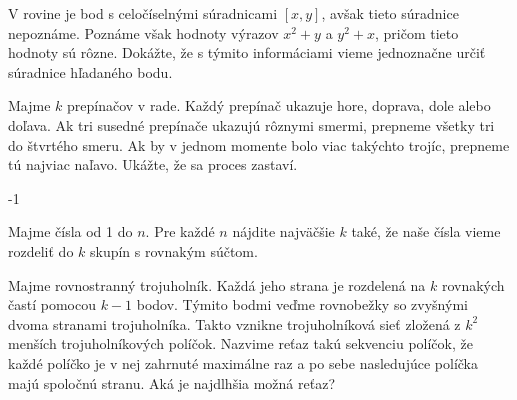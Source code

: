 {%

{
V rovine je bod s celočíselnými súradnicami $[x,y]$, avšak tieto súradnice nepoznáme. Poznáme však hodnoty výrazov $x^2+y$ a $y^2+x$, pričom tieto hodnoty sú rôzne. Dokážte, že s týmito informáciami vieme jednoznačne určiť súradnice hľadaného bodu.
}

\or


{
Majme $k$ prepínačov v rade. Každý prepínač ukazuje hore, doprava, dole alebo doľava. Ak tri susedné prepínače ukazujú rôznymi smermi, prepneme všetky tri do štvrtého smeru. Ak by v jednom momente bolo viac takýchto trojíc, prepneme tú najviac naľavo. 
Ukážte, že sa proces zastaví.
}


\fi

\else

\ifcase\numexpr\value{uloha}-1


{
Majme čísla od 1 do $n$. Pre každé $n$ nájdite najväčšie $k$ také, že naše čísla vieme rozdeliť do $k$ skupín s rovnakým súčtom.
}

\or


{
Majme rovnostranný trojuholník. Každá jeho strana je rozdelená na $k$ rovnakých častí pomocou $k-1$ bodov. Týmito bodmi veďme rovnobežky so zvyšnými dvoma stranami trojuholníka. Takto vznikne trojuholníková sieť zložená z $k^2$ menších trojuholníkových políčok. Nazvime reťaz takú sekvenciu políčok, že každé políčko je v nej zahrnuté maximálne raz a po sebe nasledujúce políčka majú spoločnú stranu. Aká je najdlhšia možná reťaz?
}

\or


}
